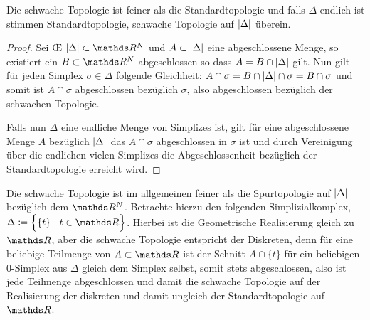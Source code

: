 \begin{Lem}
  Die schwache Topologie ist feiner als die Standardtopologie und
  falls $\Delta$ endlich ist stimmen Standardtopologie, schwache
  Topologie auf $\left| \Delta \right|$ überein.
  \begin{proof}
    Sei \OE\; $\gr{\Delta} \subset \R^N$ und $A \subset \left| \Delta \right|$
    eine abgeschlossene Menge, so existiert ein $B \subset \R^N$
    abgeschlossen so dass $A = B \cap \left| \Delta \right|$ gilt. Nun gilt für
    jeden Simplex $\sigma \in \Delta$ folgende Gleichheit:
    $A \cap \sigma = B \cap \left| \Delta \right| \cap \sigma = B \cap \sigma$
    und somit ist $A \cap \sigma$ abgeschlossen bezüglich $\sigma$,
    also abgeschlossen bezüglich der schwachen Topologie.

    Falls nun $\Delta$ eine endliche Menge von Simplizes ist, gilt für
    eine abgeschlossene Menge $A$ bezüglich $\left| \Delta \right|$ das
    $A \cap \sigma$ abgeschlossen in $\sigma$ ist und durch
    Vereinigung über die endlichen vielen Simplizes die
    Abgeschlossenheit bezüglich der Standardtopologie erreicht wird.
  \end{proof}
\end{Lem}

\begin{Bem}
  Die schwache Topologie ist im allgemeinen feiner als die
  Spurtopologie auf $\left| \Delta \right|$ bezüglich dem $\R^N$. Betrachte
  hierzu den folgenden Simplizialkomplex,
  $\Delta \coloneqq \set{ \{t\} }{t \in \R}$.  Hierbei ist die
  Geometrische Realisierung gleich zu $\R$, aber die schwache
  Topologie entspricht der Diskreten, denn für eine beliebige
  Teilmenge von $A \subset \R$ ist der Schnitt $A \cap \{ t \}$ für
  ein beliebigen $0$-Simplex aus $\Delta$ gleich dem Simplex selbst,
  somit stets abgeschlossen, also ist jede Teilmenge abgeschlossen und
  damit die schwache Topologie auf der Realisierung der diskreten und
  damit ungleich der Standardtopologie auf $\R$.
\end{Bem}




